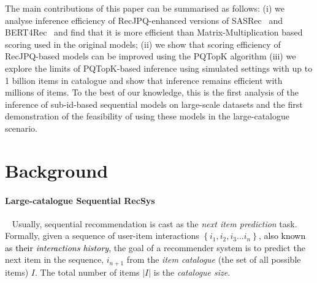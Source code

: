 \documentclass[sigconf,natbib=true, review=False]{acmart} %
\newcommand{\pageenlarge}[1]{\marginnote{#1}\enlargethispage{#1\baselineskip}}
\newcommand{\gsasha}[1]{\textcolor[HTML]{000000}{#1}}
\newcommand{\nt}[1]{\textcolor{black}{#1}}
\begin{document}
 The main contributions of this paper can be summarised as follows: (i) we analyse inference efficiency of RecJPQ-enhanced versions of SASRec~\cite{SASRec} and BERT4Rec~\cite{BERT4Rec} and find that it is more efficient than Matrix-Multiplication based scoring used in the original models; (ii) we show that scoring \gsasha{efficiency} of RecJPQ-based models can be \gsasha{improved using the PQTopK algorithm} (iii) we explore the limits of \gsasha{PQTopK}-based inference using simulated settings with up to 1 billion items in catalogue and show that inference remains efficient with millions of items.
To the best of our knowledge, this is the first analysis of the inference of sub-id-based sequential models on large-scale datasets and the first demonstration of the feasibility of using these models in the large-catalogue scenario. 


\vspace{-1\baselineskip}
\section{Background}\label{ssec:recess:preliminarilies}
\paragraph{Large-catalogue Sequential RecSys}\label{sec:rec}\
 Usually, sequential recommendation is cast as the \emph{next item prediction} task. Formally, given a sequence of user-item interactions $\left\{i_1, i_2, i_3 ... i_n\right\}$, \nt{also known as their \textit{interactions history},} the goal of a recommender system is to predict the next item in the sequence, $i_{n+1}$ from the \emph{item catalogue} (the set of all possible items) $I$. The total number of items $|I|$ is the \emph{catalogue size}.
\end{document}
